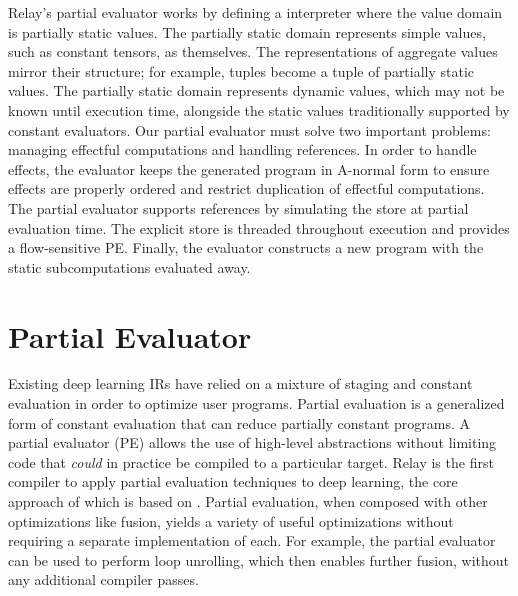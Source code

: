 Relay's partial evaluator works by defining a interpreter
  where the value domain is partially static values.
The partially static domain represents simple values,
  such as constant tensors, as themselves.
The representations
  of aggregate values mirror their structure; for example,
  tuples become a tuple of partially static values.
The partially static domain represents dynamic values,
  which may not be known until execution time,
  alongside the static values traditionally supported by
  constant evaluators.
Our partial evaluator must solve two important problems:
  managing effectful computations and handling references.
In order to handle effects, the evaluator keeps the generated
  program in A-normal form to ensure effects are properly ordered
  and restrict duplication of effectful computations.
The partial evaluator supports references by
  simulating the store at partial evaluation time.
The explicit store is threaded throughout execution
  and provides a flow-sensitive PE.
Finally, the evaluator constructs a new program with
  the static subcomputations evaluated away.

\section{Partial Evaluator}
Existing deep learning IRs have relied on
  a mixture of staging and constant evaluation
  in order to optimize user programs.
Partial evaluation is a generalized form of constant
  evaluation that can reduce partially constant
  programs.
A partial evaluator (PE) allows the use of high-level abstractions
  without limiting code that \textit{could} in practice be
  compiled to a particular target.
Relay is the first compiler to apply partial evaluation
  techniques to deep learning, the
  core approach of which is based on \citep{pe_ref}.
Partial evaluation, when composed with other
  optimizations like fusion, yields a variety
  of useful optimizations without requiring
  a separate implementation of each.
For example, the partial evaluator can be used to perform
  loop unrolling, which then enables further fusion,
  without any additional compiler passes.

